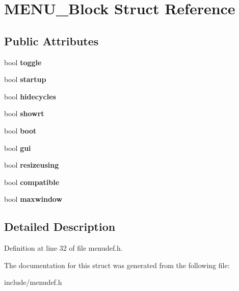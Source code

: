 \hypertarget{structMENU__Block}{\section{M\-E\-N\-U\-\_\-\-Block Struct Reference}
\label{structMENU__Block}
}
\subsection*{Public Attributes}
\begin{DoxyCompactItemize}
\item 
\hypertarget{structMENU__Block_a6c5f21b6b9199f65d85f05dbc68b7199}{bool {\bfseries toggle}}\label{structMENU__Block_a6c5f21b6b9199f65d85f05dbc68b7199}

\item 
\hypertarget{structMENU__Block_a7ff5fa9dcabef88ab98f39632a63eb59}{bool {\bfseries startup}}\label{structMENU__Block_a7ff5fa9dcabef88ab98f39632a63eb59}

\item 
\hypertarget{structMENU__Block_a3b0f7f16ac00b51acb0234ef629b0afa}{bool {\bfseries hidecycles}}\label{structMENU__Block_a3b0f7f16ac00b51acb0234ef629b0afa}

\item 
\hypertarget{structMENU__Block_a25fb23cddb1193d8938ef54ba843734a}{bool {\bfseries showrt}}\label{structMENU__Block_a25fb23cddb1193d8938ef54ba843734a}

\item 
\hypertarget{structMENU__Block_a605bed0d4d6ba34e5df039ba02bc3c19}{bool {\bfseries boot}}\label{structMENU__Block_a605bed0d4d6ba34e5df039ba02bc3c19}

\item 
\hypertarget{structMENU__Block_ab2b8594073b588217b5034212a4f2f8d}{bool {\bfseries gui}}\label{structMENU__Block_ab2b8594073b588217b5034212a4f2f8d}

\item 
\hypertarget{structMENU__Block_affa4ec1ef935e6f41ea105a6e006e525}{bool {\bfseries resizeusing}}\label{structMENU__Block_affa4ec1ef935e6f41ea105a6e006e525}

\item 
\hypertarget{structMENU__Block_a010c299923bbffd7cd8cc5d4bbcd665b}{bool {\bfseries compatible}}\label{structMENU__Block_a010c299923bbffd7cd8cc5d4bbcd665b}

\item 
\hypertarget{structMENU__Block_a3da72084c5a81c8d383e467e3c51a39c}{bool {\bfseries maxwindow}}\label{structMENU__Block_a3da72084c5a81c8d383e467e3c51a39c}

\end{DoxyCompactItemize}


\subsection{Detailed Description}


Definition at line 32 of file menudef.\-h.



The documentation for this struct was generated from the following file\-:\begin{DoxyCompactItemize}
\item 
include/menudef.\-h\end{DoxyCompactItemize}
